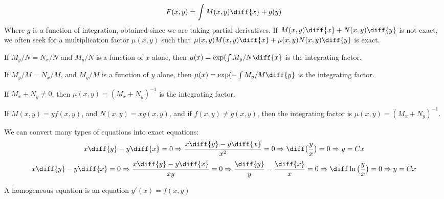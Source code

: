         \begin{equation*}
            F(x,y)=\int{M(x,y)\diff{x}}+g(y)
        \end{equation*}
        Where $g$ is a function of integration, obtained
        since we are taking partial derivatives.
        If $M(x,y)\diff{x}+N(x,y)\diff{y}$ is not exact, we
        often seek for a multiplication factor $\mu(x,y)$ such that
        $\mu(x,y)M(x,y)\diff{x}+\mu(x,y)N(x,y)\diff{y}$ is exact.
        \begin{theorem}
            If $M_{y}/N=N_{x}/N$ and $M_{y}/N$ is a function of
            $x$ alone, then $\mu(x)=\exp(\int{M_{y}/N}\diff{x}$ is
            the integrating factor.
        \end{theorem}
        \begin{theorem}
            If $M_{y}/M=N_{x}/M$, and
            $M_{y}/M$ is a function of $y$ alone, then
            $\mu(x)=\exp(-\int{M_{y}/M}\diff{y}$ is the
            integrating factor.
        \end{theorem}
        \begin{theorem}
            If $M_{x}+N_{y}\ne{0}$, then
            $\mu(x,y)=(M_{x}+N_{y})^{-1}$ is
            the integrating factor.
        \end{theorem}
        \begin{theorem}
            If $M(x,y)=yf(x,y)$, and
            $N(x,y)=xg(x,y)$, and if
            $f(x,y)\ne{g(x,y)}$, then the
            integrating factor is
            $\mu(x,y)=(M_{x}+N_{y})^{-1}$.
        \end{theorem}
        \begin{example}
            We can convert many types of equations into exact
            equations:
            \begin{equation*}
                x\diff{y}-y\diff{x}=0
                \Rightarrow\frac{x\diff{y}-y\diff{x}}{x^{2}}=0
                \Rightarrow\diff\big(\frac{y}{x}\big)=0
                \Rightarrow{y=Cx}
            \end{equation*}
            \begin{equation*}
                x\diff{y}-y\diff{x}=0
                \Rightarrow\frac{x\diff{y}-y\diff{x}}{xy}=0
                \Rightarrow\frac{\diff{y}}{y}-\frac{\diff{x}}{x}=0
                \Rightarrow\diff\ln\big(\frac{y}{x}\big)=0
                \Rightarrow{y=Cx}
            \end{equation*}
        \end{example}
        A homogeneous equation is an equation $y'(x)=f(x,y)$
